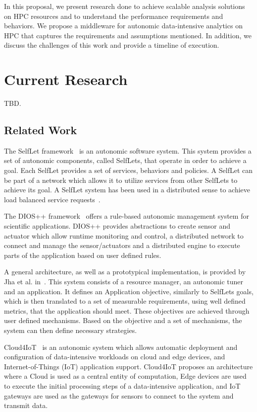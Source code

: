 In this proposal, we present research done to achieve scalable analysis solutions 
on HPC resources and to understand the performance requirements and behaviors. We 
propose a middleware for autonomic data-intensive analytics on HPC that captures 
the requirements and assumptions mentioned. In addition, we discuss the challenges 
of this work and provide a timeline of execution.

\section{Current Research}

TBD.

\subsection{Related Work}

The SelfLet framework~\cite{bindelli2008building} is an autonomic software system. 
This system provides a set of autonomic components, called SelfLets, that operate 
in order to achieve a goal. Each SelfLet provides a set of services, behaviors 
and policies. A SelfLet can be part of a network which allows it to utilize 
services from other SelfLets to achieve its goal. A SelfLet system has been used 
in a distributed sense to achieve load balanced service requests~\cite{calcavecchia2010emergence}.

The DIOS++ framework~\cite{liu2003dios} offers a rule-based autonomic management 
system for scientific applications. DIOS++ provides abstractions to create sensor 
and actuator which allow runtime monitoring and control, a distributed network to 
connect and manage the sensor/actuators and a distributed engine to execute parts 
of the application based on user defined rules.

A general architecture, as well as a prototypical implementation, is provided by 
Jha et al. in~\cite{jha2009self}. This system consists of a resource manager, an 
autonomic tuner and an application. It defines an Application objective, similarly 
to SelfLets goals, which is then translated to a set of measurable requirements, 
using well defined metrics, that the application should meet. These objectives 
are achieved through user defined mechanisms. Based on the objective and a set 
of mechanisms, the system can then define necessary strategies.

Cloud4IoT~\cite{pizzolli2016cloud4iot} is an autonomic system which allows automatic 
deployment and configuration of data-intensive workloads on cloud and edge devices, 
and Internet-of-Things (IoT) application support. Cloud4IoT proposes an architecture 
where a Cloud is used as a central entity of computation, Edge devices are used to 
execute the initial processing steps of a data-intensive application, and IoT 
gateways are used as the gateways for sensors to connect to the system and 
transmit data.

